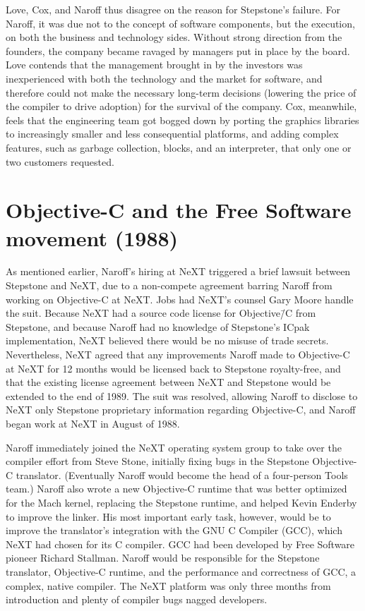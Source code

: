 \documentclass[acmsmall]{acmart}\settopmatter{}
\begin{document}
Love, Cox, and Naroff thus disagree on the reason for Stepstone's failure. For Naroff, it was due not to the concept of software components, but the execution, on both the business and technology sides. Without strong direction from the founders, the company became ravaged by managers put in place by the board. Love contends that the management brought in by the investors was inexperienced with both the technology and the market for software, and therefore could not make the necessary long-term decisions (lowering the price of the compiler to drive adoption) for the survival of the company. Cox, meanwhile, feels that the engineering team got bogged down by porting the graphics libraries to increasingly smaller and less consequential platforms, and adding complex features, such as garbage collection, blocks, and an interpreter, that only one or two customers requested. 

\section{Objective-C and the Free Software movement (1988)}
\label{sec-freesoftware1988}
As mentioned earlier, Naroff's hiring at NeXT triggered a brief lawsuit between Stepstone and NeXT, due to a non-compete agreement barring Naroff from working on Objective-C at NeXT. Jobs had NeXT's counsel Gary Moore handle the suit. Because NeXT had a source code license for Objective\=/C from Stepstone, and because Naroff had no knowledge of Stepstone's ICpak implementation, NeXT believed there would be no misuse of trade secrets. Nevertheless, NeXT agreed that any improvements Naroff made to Objective-C at NeXT for 12 months would be licensed back to Stepstone royalty-free, and that the existing license agreement between NeXT and Stepstone would be extended to the end of 1989. The suit was resolved, allowing Naroff to disclose to NeXT only Stepstone proprietary information regarding Objective-C, and Naroff began work at NeXT in August of 1988. 

Naroff immediately joined the NeXT operating system group to take over the compiler effort from Steve Stone, initially fixing bugs in the Stepstone Objective-C translator. (Eventually Naroff would become the head of a four-person Tools team.) Naroff also wrote a new Objective-C runtime that was better optimized for the Mach kernel, replacing the Stepstone runtime, and helped Kevin Enderby to improve the linker. His most important early task, however, would be to improve the translator's integration with the GNU C Compiler (GCC), which NeXT had chosen for its C compiler. GCC had been developed by Free Software pioneer Richard Stallman. Naroff would be responsible for the Stepstone translator, Objective-C runtime, and the performance and correctness of GCC, a complex, native compiler. The NeXT platform was only three months from introduction and plenty of compiler bugs nagged developers.
\end{document}
